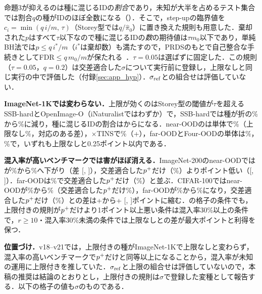 命題3が抑えるのは種に混じるIDの\textit{割合}であり，未知が大半を占めるテスト集合では割合$q$の種がIDのほぼ全数になる（）．そこで，step-upの臨界値を$c_i=\min(q\,i/m,\,\tau)$（Storey型では$q/\hat{\pi}_0$）に置き換えた規則も用意した．棄却された$p$はすべて$\tau$以下なので種に混じるIDの\textit{数}の期待値は$\tau m_0$以下であり，単純BH法では$p\le q\,i^*/m$（$i^*$は棄却数）も満たすので，PRDSのもとで自己整合な手続きとしてFDR$\le q\,m_0/m$が保たれる~\cite{blanchard2008two}．$\tau{=}0.05$は選ばずに固定した．この規則（$\tau{=}0.05$，$q{=}0.2$）は交差適合した$\sigma$について実行前に登録し，上限なしと同じ実行の中で評価した（付録\ref{sec:app_hyp}）．$\sigma_{\mathrm{ref}}$との組合せは評価していない．

\textbf{ImageNet-1Kでは変わらない．}上限が効くのはStorey型の閾値が$\tau$を超えるSSB-hardとOpenImage-O（iNaturalistではわずか）で，SSB-hardでは種が折の\NCapSeedSsbHardStoreyRatio\%から\NCapSeedSsbHardStoreycRatio\%に減り，種に混じるIDの割合は\NCapSeedSsbHardStoreyIdfrac{}から\NCapSeedSsbHardStoreycIdfrac{}になる．near-OODの\FPR{}は単体で\NCapStoreycAloneNearFpr\%（上限なし\NAloneNearFpr\%，対応のある差\NCapStoreycAloneNearDfprVsStorey{}），$\times$TINSで\NCapStoreycNearFpr\%（+\NCapStoreycNearDfprVsStorey{}），far-OODとFour-OODの単体は\NCapStoreycAloneFarFpr\%，\NCapStoreycAloneFourFpr\%で，いずれも上限なしと0.25ポイント以内である．

\textbf{混入率が高いベンチマークでは害がほぼ消える．}ImageNet-200のnear-OODでは\FPR{}が\NInTwoZeroZeroMainNearFpr\%から\NInTwoZeroZeroStoreycNearFpr\%へ下がり（差\NInTwoZeroZeroStoreycNearDfprVsStorey{} [\NInTwoZeroZeroStoreycNearDfprVsStoreyLo, \NInTwoZeroZeroStoreycNearDfprVsStoreyHi]），交差適合した$p^{+}$だけ（\NInTwoZeroZeroLpNearFpr\%）より\NInTwoZeroZeroStoreycNearDfprVsLpAbs{}ポイント低い（[\NInTwoZeroZeroStoreycNearDfprVsLpLo, \NInTwoZeroZeroStoreycNearDfprVsLpHi]）．far-OODは\NInTwoZeroZeroStoreycFarFpr\%で交差適合した$p^{+}$だけ（\NInTwoZeroZeroLpFarFpr\%）と並ぶ．CIFAR-100ではnear-OODが\NCifarMainNearFpr\%から\NCifarStoreycNearFpr\%（交差適合した$p^{+}$だけ\NCifarLpNearFpr\%），far-OODが\NCifarMainFarFpr\%から\NCifarStoreycFarFpr\%になり，交差適合した$p^{+}$だけ（\NCifarLpFarFpr\%）との差は+\NCifarMainFarDfprVsLp{}から+\NCifarStoreycFarDfprVsLp{} [\NCifarStoreycFarDfprVsLpLo, \NCifarStoreycFarDfprVsLpHi]ポイントに縮む．の格子の\NCaprecNCells{}条件でも，上限付きの規則が$p^{+}$だけより1ポイント以上悪い条件は混入率30\%以上の\NCaprecNHi{}条件で\NCaprecStoreycHiNWorseLpOne{}，$r\ge10$・混入率30\%未満の\NCaprecLoROneZeroN{}条件では上限なしとの差が最大\NCaprecLoROneZeroMaxStoreycMinusStorey{}ポイントと利得を保つ．

\textbf{位置づけ．}v18--v21では，上限付きの種がImageNet-1Kで上限なしと変わらず，混入率の高いベンチマークで$p^{+}$だけと同等以上になることから，混入率が未知の運用に上限付きを推していた．$\sigma_{\mathrm{ref}}$と上限の組合せは評価していないので，本稿の推奨は結論のとおりとし，上限付きの規則は$\sigma$で登録した変種として報告する．以下の格子の値も$\sigma$のものである．
